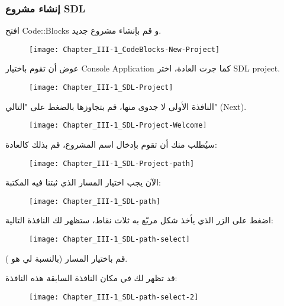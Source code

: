 \subsubsection{إنشاء مشروع \textenglish{SDL}}

افتح
\textenglish{Code::Blocks}
و قم بإنشاء مشروع جديد.

\begin{figure}[H]
	\centering
	\texttt{[image: Chapter\_III-1\_CodeBlocks-New-Project]}
\end{figure}


عوض أن تقوم باختيار 
\textenglish{Console Application}
كما جرت العادة، اختر 
\textenglish{SDL project}.

\begin{figure}[H]
	\centering
	\texttt{[image: Chapter\_III-1\_SDL-Project]}
\end{figure}

النافذة الأولى لا جدوى منها، قم بتجاوزها بالضغط على "التالي"
(\textenglish{Next}).

\begin{figure}[H]
	\centering
	\texttt{[image: Chapter\_III-1\_SDL-Project-Welcome]}
\end{figure}

سيُطلب منك أن تقوم بإدخال اسم المشروع، قم بذلك كالعادة:

\begin{figure}[H]
	\centering
	\texttt{[image: Chapter\_III-1\_SDL-Project-path]}
\end{figure}

الآن يجب اختيار المسار الذي ثبتنا فيه المكتبة:

\begin{figure}[H]
	\centering
	\texttt{[image: Chapter\_III-1\_SDL-path]}
\end{figure}

اضغط على الزر الذي يأخذ شكل مربّع به ثلاث نقاط، ستظهر لك النافذة التالية:

\begin{figure}[H]
	\centering
	\texttt{[image: Chapter\_III-1\_SDL-path-select]}
\end{figure}

قم باختيار المسار (بالنسبة لي هو
).

قد تظهر لك في مكان النافذة السابقة هذه النافذة:

\begin{figure}[H]
	\centering
	\texttt{[image: Chapter\_III-1\_SDL-path-select-2]}
\end{figure}

